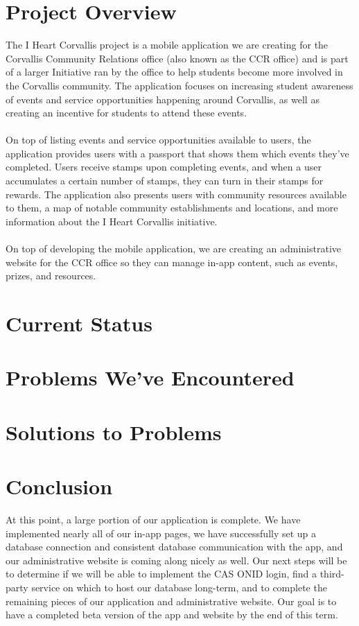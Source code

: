 \documentclass[onecolumn, draftclsnofoot,10pt, compsoc]{IEEEtran}
\begin{document}
\section{Project Overview}
	The I Heart Corvallis project is a mobile application we are creating for the Corvallis Community Relations office (also known as the CCR office) and is part of a larger Initiative ran by the office to help students become more involved in the Corvallis community. The application focuses on increasing student awareness of events and service opportunities happening around Corvallis, as well as creating an incentive for students to attend these events. \\ \\
	On top of listing events and service opportunities available to users, the application provides users with a passport that shows them which events they’ve completed. Users receive stamps upon completing events, and when a user accumulates a certain number of stamps, they can turn in their stamps for rewards. The application also presents users with community resources available to them, a map of notable community establishments and locations, and more information about the I Heart Corvallis initiative. \\ \\
  On top of developing the mobile application, we are creating an administrative website for the CCR office so they can manage in-app content, such as events, prizes, and resources.

\section{Current Status}
  


\section{Problems We've Encountered}


\section{Solutions to Problems}


\section{Conclusion}
	At this point, a large portion of our application is complete. We have implemented nearly all of our in-app pages, we have successfully set up a database connection and consistent database communication with the app, and our administrative website is coming along nicely as well. Our next steps will be to determine if we will be able to implement the CAS ONID login, find a third-party service on which to host our database long-term, and to complete the remaining pieces of our application and administrative website. Our goal is to have a completed beta version of the app and website by the end of this term.
\end{document}
